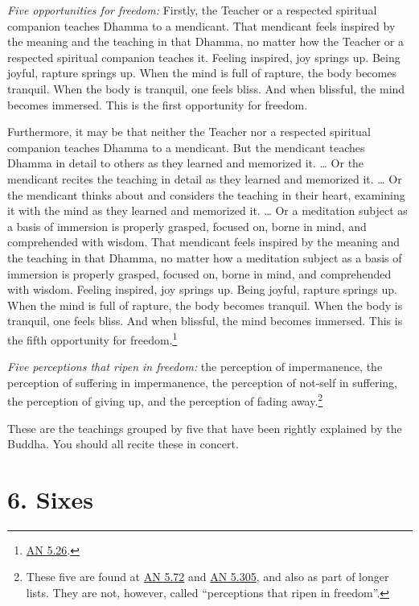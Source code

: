 \documentclass[12pt,openany]{book}%
\begin{document}
\emph{Five opportunities for freedom:} Firstly, the Teacher or a respected spiritual companion teaches Dhamma to a mendicant. That mendicant feels inspired by the meaning and the teaching in that Dhamma, no matter how the Teacher or a respected spiritual companion teaches it. Feeling inspired, joy springs up. Being joyful, rapture springs up. When the mind is full of rapture, the body becomes tranquil. When the body is tranquil, one feels bliss. And when blissful, the mind becomes immersed. This is the first opportunity for freedom. 

Furthermore, it may be that neither the Teacher nor a respected spiritual companion teaches Dhamma to a mendicant. But the mendicant teaches Dhamma in detail to others as they learned and memorized it. … Or the mendicant recites the teaching in detail as they learned and memorized it. … Or the mendicant thinks about and considers the teaching in their heart, examining it with the mind as they learned and memorized it. … Or a meditation subject as a basis of immersion is properly grasped, focused on, borne in mind, and comprehended with wisdom. That mendicant feels inspired by the meaning and the teaching in that Dhamma, no matter how a meditation subject as a basis of immersion is properly grasped, focused on, borne in mind, and comprehended with wisdom. Feeling inspired, joy springs up. Being joyful, rapture springs up. When the mind is full of rapture, the body becomes tranquil. When the body is tranquil, one feels bliss. And when blissful, the mind becomes immersed. This is the fifth opportunity for freedom.\footnote{\href{https://suttacentral.net/an5.26/en/sujato}{AN 5.26}. } 

\emph{Five perceptions that ripen in freedom:} the perception of impermanence, the perception of suffering in impermanence, the perception of not-self in suffering, the perception of giving up, and the perception of fading away.\footnote{These five are found at \href{https://suttacentral.net/an5.72/en/sujato}{AN 5.72} and \href{https://suttacentral.net/an5.305/en/sujato}{AN 5.305}, and also as part of longer lists. They are not, however, called “perceptions that ripen in freedom”. } 

These are the teachings grouped by five that have been rightly explained by the Buddha. You should all recite these in concert. 

\section*{6. Sixes }
\end{document}
